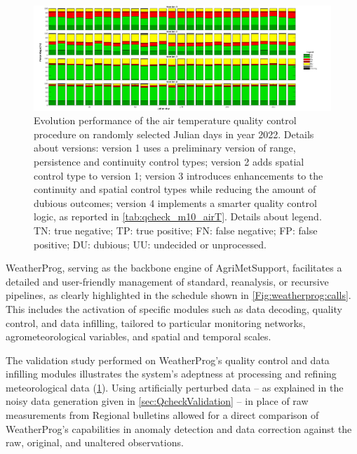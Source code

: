 \documentclass[authoryear,preprint,review,12pt]{elsarticle}
\begin{document}
\begin{figure}
	\centering
	\includegraphics[scale=.30]{figures/Fig_qck_versions_v2.tif}
	\caption{ Evolution performance of the air temperature quality control procedure on randomly selected Julian days in year 2022.
    Details about versions: version 1 uses a preliminary version of range, persistence and continuity control types; version 2 adds spatial control type to version 1; version 3 introduces enhancements to the continuity and spatial control types while reducing the amount of dubious outcomes; version 4 implements a smarter quality control logic, as reported in \cref{tab:qcheck_m10_airT}.
    Details about legend. TN: true negative; TP: true positive; FN: false negative; FP: false positive; DU: dubious; UU: undecided or unprocessed. }
	\label{fig:perturbationCharts}
\end{figure}

WeatherProg, serving as the backbone engine of AgriMetSupport, facilitates a detailed and user-friendly management of standard, reanalysis, or recursive pipelines, as clearly highlighted in the schedule shown in \cref{Fig:weatherprog:calls}.
This includes the activation of specific modules such as data decoding, quality control, and data infilling, tailored to particular monitoring networks, agrometeorological variables, and spatial and temporal scales.

The validation study performed on WeatherProg's quality control and data infilling modules illustrates the system's adeptness at processing and refining meteorological data (\cref{fig:perturbationCharts}).
Using artificially perturbed data -- as explained in the noisy data generation given in \cref{sec:QcheckValidation} -- in place of raw measurements from Regional bulletins allowed for a direct comparison of WeatherProg's capabilities in anomaly detection and data correction against the raw, original, and unaltered observations.
\end{document}
